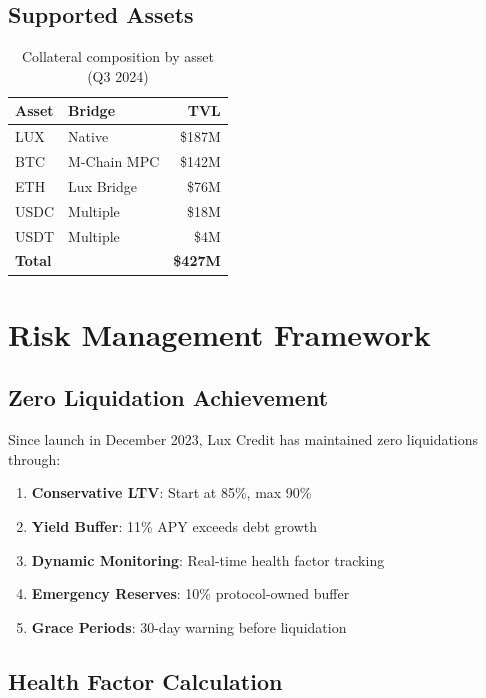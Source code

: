 \documentclass[11pt,a4paper]{article}
\begin{document}
\subsection{Supported Assets}

\begin{table}[h]
\centering
\begin{tabular}{@{}llr@{}}
\toprule
\textbf{Asset} & \textbf{Bridge} & \textbf{TVL} \\ \midrule
LUX & Native & \$187M \\
BTC & M-Chain MPC & \$142M \\
ETH & Lux Bridge & \$76M \\
USDC & Multiple & \$18M \\
USDT & Multiple & \$4M \\ \midrule
\textbf{Total} & & \textbf{\$427M} \\ \bottomrule
\end{tabular}
\caption{Collateral composition by asset (Q3 2024)}
\end{table}

\section{Risk Management Framework}

\subsection{Zero Liquidation Achievement}

Since launch in December 2023, Lux Credit has maintained zero liquidations through:

\begin{enumerate}
\item \textbf{Conservative LTV}: Start at 85\%, max 90\%
\item \textbf{Yield Buffer}: 11\% APY exceeds debt growth
\item \textbf{Dynamic Monitoring}: Real-time health factor tracking
\item \textbf{Emergency Reserves}: 10\% protocol-owned buffer
\item \textbf{Grace Periods}: 30-day warning before liquidation
\end{enumerate}

\subsection{Health Factor Calculation}
\end{document}

